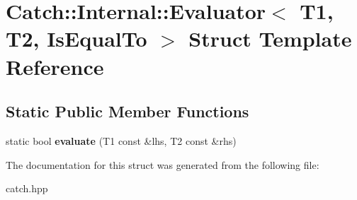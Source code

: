 \hypertarget{struct_catch_1_1_internal_1_1_evaluator_3_01_t1_00_01_t2_00_01_is_equal_to_01_4}{}\section{Catch\+:\+:Internal\+:\+:Evaluator$<$ T1, T2, Is\+Equal\+To $>$ Struct Template Reference}
\label{struct_catch_1_1_internal_1_1_evaluator_3_01_t1_00_01_t2_00_01_is_equal_to_01_4}
\subsection*{Static Public Member Functions}
\begin{DoxyCompactItemize}
\item 
\mbox{\label{struct_catch_1_1_internal_1_1_evaluator_3_01_t1_00_01_t2_00_01_is_equal_to_01_4_a166b2b7849247397e63fb2940481b217}} 
static bool {\bfseries evaluate} (T1 const \&lhs, T2 const \&rhs)
\end{DoxyCompactItemize}


The documentation for this struct was generated from the following file\+:\begin{DoxyCompactItemize}
\item 
catch.\+hpp\end{DoxyCompactItemize}
